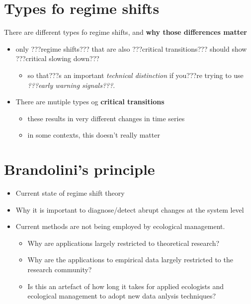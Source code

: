 \documentclass[12pt,twoside,openany]{reedthesis}
\providecommand{\tightlist}{%
  \setlength{\itemsep}{0pt}\setlength{\parskip}{0pt}}
\begin{document}
\section{Types fo regime shifts}\label{types-fo-regime-shifts}

There are different types fo regime shifts, and \textbf{why those
differences matter}
\begin{itemize}
\tightlist
\item
  only ???regime shifts??? that are also ???critical transitions???
  should show ???critical slowing down???
  \begin{itemize}
  \tightlist
  \item
    so that???s an important \emph{technical distinction} if you???re
    trying to use \emph{???early warning signals???}.\\
  \end{itemize}
\item
  There are mutiple types og \textbf{critical transitions}
  \begin{itemize}
  \tightlist
  \item
    these results in very different changes in time series\\
  \item
    in some contexts, this doesn't really matter
  \end{itemize}
\end{itemize}
\section{Brandolini's principle}\label{brandolinis-principle}
\begin{itemize}
\tightlist
\item
  Current state of regime shift theory
\item
  Why it is important to diagnose/detect abrupt changes at the system
  level
\item
  Current methods are not being employed by ecological management.
  \begin{itemize}
  \tightlist
  \item
    Why are applications largely restricted to theoretical research?
  \item
    Why are the applications to empirical data largely restricted to the
    research community?
  \item
    Is this an artefact of how long it takes for applied ecologists and
    ecological management to adopt new data anlysis techniques?
  \end{itemize}
\end{itemize}
\end{document}
